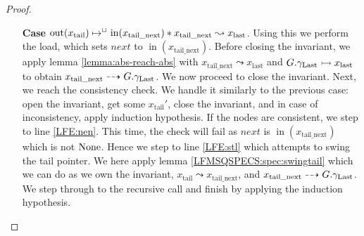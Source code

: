 \documentclass[a4paper, 10pt]{report}
\theoremstyle{definition}
\newcommand{\nIn}[1]{\operatorname{in}(#1)}
\newcommand{\nOut}[1]{\operatorname{out}(#1)}
\newcommand{\node}{x}
\newcommand{\nodeN}[1]{\node_{\mathrm{#1}}}
\newcommand{\nodetail}{\nodeN{tail}}
\newcommand{\nodelast}{\nodeN{last}}
\newcommand{\nodetailnext}{\nodeN{tail\_next}}
\newcommand{\Qg}{G}
\newcommand{\glast}{\gname_{\mathrm{Last}}}
\newcommand{\reach}[2]{#1 \leadsto #2}
\newcommand{\ar}[2]{#1 \dashrightarrow #2}
\newcommand{\ap}[2]{#1 \rightarrowtail #2}
\begin{document}
\begin{proof}
\begin{itemize}
    \item[\textbf{Case}]
    $\nOut{\nodetail} \mapsto^{\persistently} \nIn{\nodetailnext} \star{} \reach{\nodetailnext}{\nodelast}$. Using this we perform the load, which sets $next$ to $\nIn{\nodetailnext}$. Before closing the invariant, we apply lemma \ref{lemma:abs-reach-abs} with $\reach{\nodetailnext}{\nodelast}$ and $\ap{\Qg.\glast}{\nodelast}$ to obtain $\ar{\nodetailnext}{\Qg.\glast}$. We now proceed to close the invariant. Next, we reach the consistency check. We handle it similarly to the previous case: open the invariant, get some $\nodetail'$, close the invariant, and in case of inconsistency, apply induction hypothesis. If the nodes are consistent, we step to line \ref{LFE:nen}. This time, the check will fail as $next$ is $\nIn{\nodetailnext}$ which is not $\operatorname{None}$. Hence we step to line \ref{LFE:stl} which attempts to swing the tail pointer. We here apply lemma \ref{LFMSQSPECS:spec:swingtail} which we can do as we own the invariant, $\reach{\nodetail}{\nodetailnext}$, and $\ar{\nodetailnext}{\Qg.\glast}$. We step through to the recursive call and finish by applying the induction hypothesis.
  \end{itemize}
\end{proof}
\end{document}
